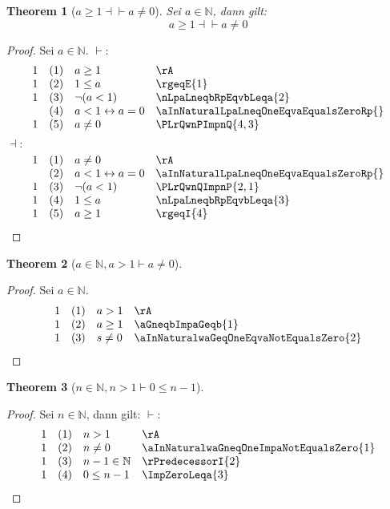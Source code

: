 \documentclass{book}
\theoremstyle{plain}
\newtheorem{theorem}{Theorem}
\theoremstyle{remark}
\theoremstyle{definition}
\begin{document}
\label{aInNaturalwaGeqOneEqvaNotEqualsZero}
\begin{theorem}[\(a\geq 1\dashv\vdash a\neq 0\)]
Sei \(a\in\mathbb{N}\), dann gilt:
\[a\geq 1\dashv\vdash a\neq 0\]
\end{theorem}
\begin{proof}
Sei \(a\in\mathbb{N}\).
\(\vdash:\)
	\[
	\begin{array}{llll}
		1 & (1) & a\geq 1 & \rA \\
		1 & (2) & 1\leq a & \rgeqE{1} \\
            1 & (3) & \neg(a<1) & \nLpaLneqbRpEqvbLeqa{2} \\
              & (4) & a<1\leftrightarrow a=0 & \aInNaturalLpaLneqOneEqvaEqualsZeroRp{} \\
            1 & (5) & a\neq 0 & \PLrQwnPImpnQ{4,3} \\
	\end{array}
	\]
	\(\dashv:\)
	\[
	\begin{array}{llll}
		1 & (1) &  a\neq 0 & \rA \\
            & (2) & a<1\leftrightarrow a=0 & \aInNaturalLpaLneqOneEqvaEqualsZeroRp{} \\
            1 & (3) &  \neg(a<1) & \PLrQwnQImpnP{2,1} \\
            1 & (4) &  1\leq a & \nLpaLneqbRpEqvbLeqa{3} \\
            1 & (5) &  a\geq 1 & \rgeqI{4} \\
	\end{array}
	\]
\end{proof}

\label{aInNaturalwaGneqOneImpaNotEqualsZero}
\begin{theorem}[\(a\in\mathbb{N},a> 1\vdash a\neq 0\)]
\end{theorem}
\begin{proof}
Sei \(a\in\mathbb{N}\).
	\[
	\begin{array}{llll}
		1 & (1) & a>1 & \rA \\
		1 & (2) & a\geq 1 & \aGneqbImpaGeqb{1} \\
            1 & (3) & s\neq 0 & \aInNaturalwaGeqOneEqvaNotEqualsZero{2} \\
	\end{array}
	\]
\end{proof}

\label{nInNaturalwnGneqOneImpZeroLeqnMinusOne}
\begin{theorem}[\(n\in\mathbb{N}, n>1\vdash 0\leq n-1\)]
\end{theorem}
\begin{proof}
Sei \(n\in\mathbb{N}\), dann gilt:
\(\vdash\):
    \[
	\begin{array}{llclll}
            1 &  (1)  & \multicolumn{3}{l}{n>1} & \rA \\
            1 &  (2)  & \multicolumn{3}{l}{n\neq 0} & \aInNaturalwaGneqOneImpaNotEqualsZero{1} \\
            1 &  (3)  & \multicolumn{3}{l}{n-1\in\mathbb{N}} & \rPredecessorI{2} \\
            1 &  (4)  & \multicolumn{3}{l}{0\leq n-1} & \ImpZeroLeqa{3} \\
        \end{array}
    \]
\end{proof}
\end{document}
